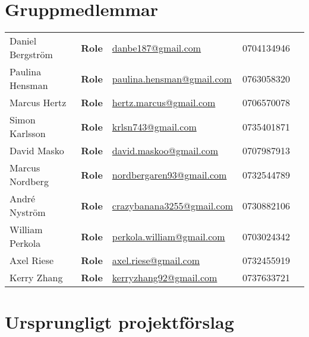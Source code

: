 \renewcommand{\appendixtocname}{Appendix}
\renewcommand{\appendixpagename}{Appendix}
\begin{appendices}
\section{Gruppmedlemmar}

\begin{tabular}{lllll}
  Daniel Bergström & \textbf{Role} & \href{mailto:danbe187@gmail.com}{danbe187@gmail.com} & 0704134946 \\
  Paulina Hensman & \textbf{Role} & \href{mailto:paulina.hensman@gmail.com}{paulina.hensman@gmail.com} & 0763058320 \\
  Marcus Hertz & \textbf{Role} & \href{mailto:hertz.marcus@gmail.com}{hertz.marcus@gmail.com} & 0706570078 \\
  Simon Karlsson & \textbf{Role} & \href{mailto:krlsn743@gmail.com}{krlsn743@gmail.com} & 0735401871 \\
  David Masko & \textbf{Role} & \href{mailto:david.maskoo@gmail.com}{david.maskoo@gmail.com} & 0707987913 \\
  Marcus Nordberg & \textbf{Role} & \href{mailto:nordbergaren93@gmail.com}{nordbergaren93@gmail.com} & 0732544789 \\
  André Nyström & \textbf{Role} & \href{mailto:crazybanana3255@gmail.com}{crazybanana3255@gmail.com} & 0730882106 \\
  William Perkola & \textbf{Role} & \href{mailto:perkola.william@gmail.com}{perkola.william@gmail.com} & 0703024342 \\
  Axel Riese & \textbf{Role} & \href{mailto:axel.riese@gmail.com}{axel.riese@gmail.com} & 0732455919 \\
  Kerry Zhang & \textbf{Role} & \href{mailto:kerryzhang92@gmail.com}{kerryzhang92@gmail.com} & 0737633721 \\
\end{tabular}

\section{Ursprungligt projektförslag}

\end{appendices}
